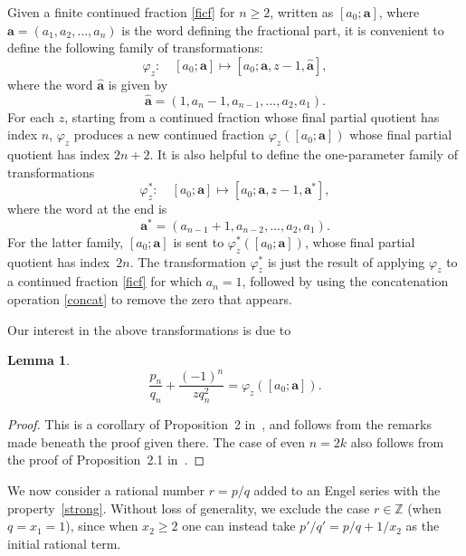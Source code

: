 \documentclass[10pt, a4paper]{amsart}
\numberwithin{equation}{section}
\theoremstyle{plain}
\newtheorem{lem}[thm]{Lemma}
\theoremstyle{definition}
\newcommand{\Z}{\mathbb{Z}}
\begin{document}
Given a finite continued fraction \eqref{ficf} for $n\geq 2$, written  as 
$
[a_0; \mathbf{a}]$, where $\mathbf{a}=(a_1,a_2,\ldots,a_n)$ is the word 
defining the fractional part, it is 
convenient to define the following family of transformations:
\begin{equation}
\label{zfam} 
\varphi_z : \quad [a_0; \mathbf{a}] \mapsto [a_0; \mathbf{a}, z-1, \hat{\mathbf{a}}], 
\end{equation} 
where 
the word $\hat{\mathbf{a}}$ is given by 
\[ 
\hat{\mathbf{a}}=(1,a_n-1,a_{n-1},\ldots,a_2,a_1). 
\] 
For each $z$, starting from   a continued fraction whose 
final partial quotient has index $n$, 
$\varphi_z$ produces a new continued fraction
$\varphi_z([a_0;\mathbf{a}])$ whose 
final partial quotient has index $2n+2$. It is also 
helpful to define the one-parameter family of transformations 
\begin{equation}
\label{zsfam} 
\varphi_z^* : \quad [a_0; \mathbf{a}] \mapsto [a_0; \mathbf{a}, z-1, \mathbf{a}^*], 
\end{equation} 
where the word at the end is  
\[ 
\mathbf{a}^*=(a_{n-1}+1,a_{n-2},\ldots,a_2,a_1). 
\] 
For the latter family, $[a_0;\mathbf{a}]$ is sent to 
$\varphi_z^*([a_0;\mathbf{a}])$, whose 
final partial quotient has index~$2n$. 
The transformation $\varphi^*_z$ is just the result of applying 
$\varphi_z$ to a continued fraction \eqref{ficf} for which $a_n=1$, 
followed by using the concatenation operation \eqref{concat} 
to remove the zero that appears. 

Our interest in the above transformations is due to 

\begin{lem}
\label{trans} 
\[ 
\frac{p_n}{q_n}+ \frac{(-1)^n}{zq_n^2} = \varphi_z([a_0;\mathbf{a}]). 
\]  
\end{lem}

\begin{proof} 
This is a corollary of Proposition~2 in~\cite{folded}, and 
follows from the remarks made beneath the proof given  there. 
The case of even $n=2k$
also follows from the proof of 
Proposition~2.1 in~\cite{Hone2}. 
\end{proof}

We now consider a rational number $r=p/q$ added to an Engel series 
with the property~\eqref{strong}.  Without loss of generality, we 
exclude the case $r\in \Z$ (when $q=x_1=1$), since when 
$x_2\geq 2$ one can instead take $p'/q'=p/q+1/x_2$ 
as the initial rational term. 
\end{document}
